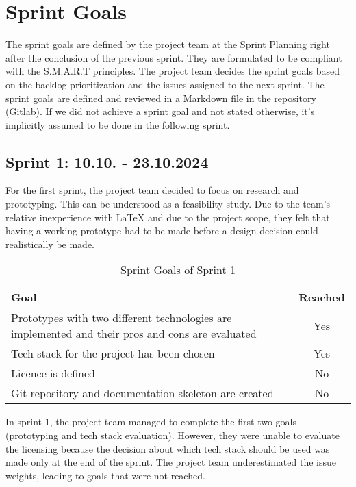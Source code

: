 \section{Sprint Goals}\label{sec:sprint-goals}
The sprint goals are defined by the project team at the Sprint Planning right after the conclusion of the previous sprint.
They are formulated to be compliant with the S.M.A.R.T principles.
The project team decides the sprint goals based on the backlog
prioritization and the issues assigned to the next sprint.
The sprint goals are defined and reviewed in a Markdown file in the repository (\href{https://gitlab.ti.bfh.ch/decibel-threshold-event-displayer/decibel-threshold-event-displayer/-/blob/main/doc/scrum/sprints.md}{Gitlab}).
If we did not achieve a sprint goal and not stated otherwise, it's implicitly assumed to be done in the following sprint.

\subsection{Sprint 1: 10.10. - 23.10.2024}\label{subsec:sprint-1}
For the first sprint, the project team decided to focus on research and prototyping.
This can be understood as a feasibility study.
Due to the team's relative inexperience with LaTeX and due to the project scope, they felt that having a working prototype had to be
made before a design decision could realistically be made. \\
\begin{table}[H]
    \centering
    \begin{tabularx}{\textwidth}{X c}
        \toprule
        \textbf{Goal}                                                                                    & \textbf{Reached} \\
        \midrule
        Prototypes with two different technologies are implemented and their pros and cons are evaluated & Yes              \\
        \midrule
        Tech stack for the project has been chosen                                                       & Yes              \\
        \midrule
        Licence is defined                                                                               & No               \\
        \midrule
        Git repository and documentation skeleton are created                                            & No               \\
        \bottomrule
    \end{tabularx}
    \caption{Sprint Goals of Sprint 1}\label{tab:sprint_goals1}
\end{table}
In sprint 1, the project team managed to complete the first two goals (prototyping and tech stack evaluation).
However, they were unable to evaluate the licensing because the decision about which tech stack should be used was made only at the end of the sprint.
The project team underestimated the issue weights, leading to goals that were not reached.


